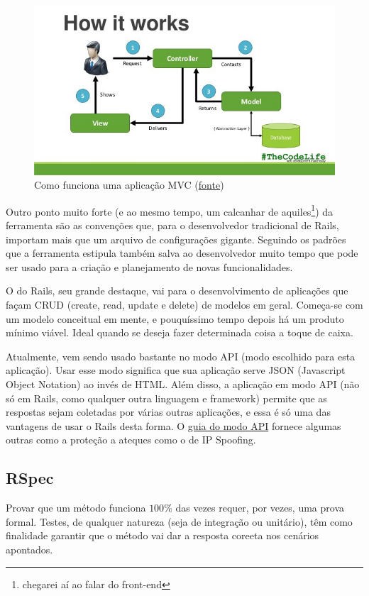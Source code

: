 \begin{figure}[htb]
    \centering
    \includegraphics[width=.7\textwidth]{figuras/mvc.jpeg}
    \caption{Como funciona uma aplicação MVC (\href{https://blog.cloudboost.io/what-is-model-view-controller-124a9942246}{fonte})}
    \label{fig:mvc}
\end{figure}

Outro ponto muito forte (e ao mesmo tempo, um calcanhar de aquiles\footnote{chegarei aí ao falar
do front-end}) da ferramenta são as convenções que, para o desenvolvedor tradicional de Rails,
importam mais que um arquivo de configurações gigante. Seguindo os padrões que a ferramenta estipula
também salva ao desenvolvedor muito tempo que pode ser usado para a criação e planejamento de novas
funcionalidades.

O  do Rails, seu grande destaque, vai para o desenvolvimento de aplicações que façam
CRUD (create, read, update e delete) de modelos em geral. Começa-se com um modelo conceitual em mente,
e pouquíssimo tempo depois há um produto mínimo viável. Ideal quando se deseja fazer determinada coisa
a toque de caixa.

Atualmente, vem sendo usado bastante no modo API (modo escolhido para esta aplicação). Usar esse
modo significa que sua aplicação serve JSON (Javascript Object Notation) ao invés de HTML. Além
disso, a aplicação em modo API (não só em Rails, como qualquer outra linguagem e framework) permite
que as respostas sejam coletadas por várias outras aplicações, e essa é só uma das vantagens de usar
o Rails desta forma. O \href{https://edgeguides.rubyonrails.org/api_app.html}{guia do modo API}
fornece algumas outras como a proteção a ateques como o de IP Spoofing.

\subsection{RSpec}
\label{subsec:rspec}

Provar que um método funciona $100\%$ das vezes requer, por vezes, uma prova
formal. Testes, de qualquer natureza (seja de integração ou unitário), têm como
finalidade garantir que o método vai dar a resposta coreeta nos cenários apontados.

